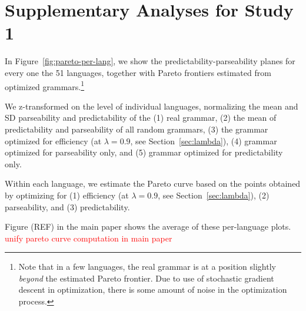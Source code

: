\documentclass[10pt,twoside,lineno]{article}
\begin{document}
\section{Supplementary Analyses for Study 1}



In Figure~\ref{fig:pareto-per-lang}, we show the predictability-parseability planes for every one the 51 languages, together with Pareto frontiers estimated from optimized grammars.\footnote{Note that in a few languages, the real grammar is at a position slightly \emph{beyond} the estimated Pareto frontier. Due to use of stochastic gradient descent in optimization, there is some amount of noise in the optimization process.}

We z-transformed on the level of individual languages, normalizing the mean and SD parseability and predictability of the (1) real grammar, (2) the mean of predictability and parseability of all random grammars, (3) the grammar optimized for efficiency (at $\lambda =0.9$, see Section~\ref{sec:lambda}), (4) grammar optimized for parseability only, and (5) grammar optimized for predictability only.

Within each language, we estimate the Pareto curve based on the points obtained by optimizing for (1) efficiency (at $\lambda = 0.9$, see Section~\ref{sec:lambda}), (2) parseability, and (3) predictability.

Figure (REF) in the main paper shows the average of these per-language plots. \textcolor{red}{unify pareto curve computation in main paper}
\end{document}
